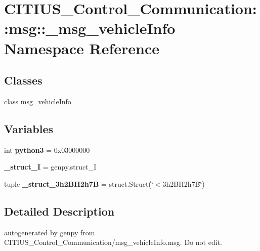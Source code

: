 \hypertarget{namespace_c_i_t_i_u_s___control___communication_1_1msg_1_1__msg__vehicle_info}{\section{\-C\-I\-T\-I\-U\-S\-\_\-\-Control\-\_\-\-Communication\-:\-:msg\-:\-:\-\_\-msg\-\_\-vehicle\-Info \-Namespace \-Reference}
\label{namespace_c_i_t_i_u_s___control___communication_1_1msg_1_1__msg__vehicle_info}
}
\subsection*{\-Classes}
\begin{DoxyCompactItemize}
\item 
class \hyperlink{class_c_i_t_i_u_s___control___communication_1_1msg_1_1__msg__vehicle_info_1_1msg__vehicle_info}{msg\-\_\-vehicle\-Info}
\end{DoxyCompactItemize}
\subsection*{\-Variables}
\begin{DoxyCompactItemize}
\item 
\hypertarget{namespace_c_i_t_i_u_s___control___communication_1_1msg_1_1__msg__vehicle_info_a4ab63ae072fa891f2f05777da308003b}{int {\bfseries python3} = 0x03000000}\label{namespace_c_i_t_i_u_s___control___communication_1_1msg_1_1__msg__vehicle_info_a4ab63ae072fa891f2f05777da308003b}

\item 
\hypertarget{namespace_c_i_t_i_u_s___control___communication_1_1msg_1_1__msg__vehicle_info_ae5c0c68192fb35c8a4f59370644bc2a5}{{\bfseries \-\_\-struct\-\_\-\-I} = genpy.\-struct\-\_\-\-I}\label{namespace_c_i_t_i_u_s___control___communication_1_1msg_1_1__msg__vehicle_info_ae5c0c68192fb35c8a4f59370644bc2a5}

\item 
\hypertarget{namespace_c_i_t_i_u_s___control___communication_1_1msg_1_1__msg__vehicle_info_a18211a72c82fe9963a5b3793fe367e98}{tuple {\bfseries \-\_\-struct\-\_\-3h2\-B\-H2h7\-B} = struct.\-Struct(\char`\"{}$<$3h2\-B\-H2h7\-B\char`\"{})}\label{namespace_c_i_t_i_u_s___control___communication_1_1msg_1_1__msg__vehicle_info_a18211a72c82fe9963a5b3793fe367e98}

\end{DoxyCompactItemize}


\subsection{\-Detailed \-Description}
\begin{DoxyVerb}autogenerated by genpy from CITIUS_Control_Communication/msg_vehicleInfo.msg. Do not edit.\end{DoxyVerb}
 